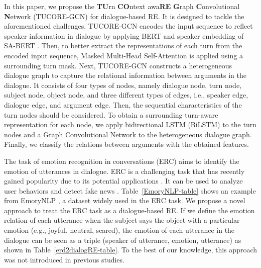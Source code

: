 \documentclass[11pt]{article}
\begin{document}
In this paper, we propose the \textbf{TU}rn \textbf{CO}ntext awa\textbf{RE} \textbf{G}raph \textbf{C}onvolutional \textbf{N}etwork (TUCORE-GCN) for dialogue-based RE. It is designed to tackle the aforementioned challenges. TUCORE-GCN encodes the input sequence to reflect speaker information in dialogue by applying BERT \citep{yu-etal-2020-dialogue} and speaker embedding of SA-BERT \citep{gu2020speaker}. Then, to better extract the representations of each turn from the encoded input sequence, Masked Multi-Head Self-Attention \citep{NIPS2017_3f5ee243} is applied using a surrounding turn mask. Next, TUCORE-GCN constructs a heterogeneous dialogue graph to capture the relational information between arguments in the dialogue. It consists of four types of nodes, namely dialogue node, turn node, subject node, object node, and three different types of edges, i.e., speaker edge, dialogue edge, and argument edge. Then, the sequential characteristics of the turn nodes should be considered. To obtain a surrounding turn-aware representation for each node, we apply bidirectional LSTM (BiLSTM) \citep{650093} to the turn nodes and a Graph Convolutional Network \citep{Kipf:2016tc} to the heterogeneous dialogue graph. Finally, we classify the relations between arguments with the obtained features.

The task of emotion recognition in conversations (ERC) aims to identify the emotion of utterances in dialogue. ERC is a challenging task that has recently gained popularity due to its potential applications \citep{poria-etal-2019-meld}. It can be used to analyze user behaviors \citep{LEE2016360} and detect fake news \citep{guo2019dean}. Table~\ref{EmoryNLP-table} shows an example from EmoryNLP \citep{DBLP:conf/aaai/ZahiriC18}, a dataset widely used in the ERC task. We propose a novel approach to treat the ERC task as a dialogue-based RE. 
If we define the emotion relation of each utterance when the subject says the object with a particular emotion (e.g., joyful, neutral, scared), the emotion of each utterance in the dialogue can be seen as a triple (speaker of utterance, emotion, utterance) as shown in Table~\ref{erd2dialogRE-table}. To the best of our knowledge, this approach was not introduced in previous studies. 
\end{document}
